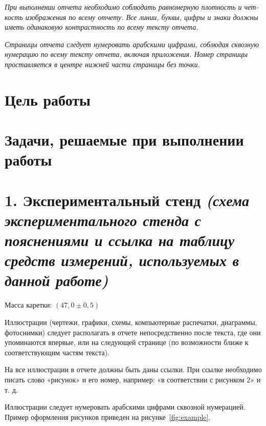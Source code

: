 \documentclass[a4paper,12pt]{article}
\begin{document}
\textit{\hspace{12.5pt} При выполнении отчета необходимо соблюдать равномерную плотность и чет-
кость изображения по всему отчету. Все линии, буквы, цифры и знаки должны иметь
одинаковую контрастность по всему тексту отчета.}

\textit{\hspace{12.5pt} Страницы отчета следует нумеровать арабскими цифрами, соблюдая сквозную
нумерацию по всему тексту отчета, включая приложения. Номер страницы проставляется в центре нижней части страницы без точки.}

\section*{\hspace{30pt} Цель работы}
\vspace{1cm}

\section*{\hspace{30pt} Задачи, решаемые при выполнении работы}
\vspace{1cm}

\newpage

\section*{\hspace{30pt} 1. Экспериментальный стенд \textit{(схема экспериментального стенда с пояснениями и ссылка на таблицу средств измерений, используемых в данной работе)}}

Масса каретки: \((47,0\pm 0,5)\)

\hspace{30pt} Иллюстрации (чертежи, графики, схемы, компьютерные распечатки, диаграммы, фотоснимки) следует располагать в отчете непосредственно после текста, где они упоминаются впервые, или на следующей странице (по возможности ближе к соответствующим частям текста).

\hspace{13pt} На все иллюстрации в отчете должны быть даны ссылки. При ссылке необходимо писать слово «рисунок» и его номер, например: «в соответствии с рисунком 2» и т. д.

\hspace{11.25pt} Иллюстрации следует нумеровать арабскими цифрами сквозной нумерацией. Пример оформления рисунков приведен на рисунке~\ref{fig:example}.
\end{document}

